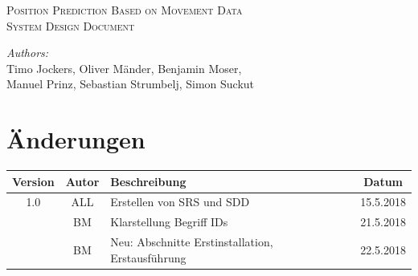 \documentclass[12pt]{article} %
\begin{document}


\begin{titlepage}

\newcommand{\HRule}{\rule{\linewidth}{0.5mm}} %

\center %

\textsc{\Large Position Prediction Based on Movement Data}\\[0.5cm] %
\textsc{\large System Design Document}\\[0.5cm] %

\vfill

\emph{Authors:}\\
Timo Jockers, Oliver Mänder, Benjamin Moser, \\
Manuel Prinz, Sebastian Strumbelj, Simon Suckut

\vfill %

\end{titlepage}


\tableofcontents %

\newpage %


\section{Änderungen}


\begin{tabular}{|c|c|p{10cm}|c|}
\hline
Version & Autor & Beschreibung & Datum \\ \hline\hline

1.0 & ALL & Erstellen von SRS und SDD & 15.5.2018 \\\hline
	& BM  &	Klarstellung Begriff IDs  &	21.5.2018 \\\hline
	& BM  &	Neu: Abschnitte Erstinstallation, Erstausführung  &	22.5.2018 \\\hline

\end{tabular}
\end{document}
